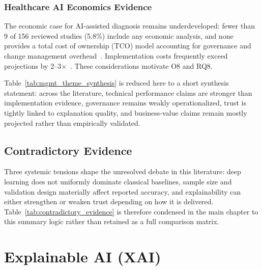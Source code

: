 \subsubsection{Healthcare AI Economics Evidence}

The economic case for AI-assisted diagnosis remains underdeveloped: fewer than 9 of 156 reviewed studies (5.8\%) include any economic analysis, and none provides a total cost of ownership (TCO) model accounting for governance and change management overhead~\cite{topol2019deep, sendak2020healthcare}. Implementation costs frequently exceed projections by 2--3$\times$~\cite{sendak2020healthcare}. These considerations motivate O8 and RQ8.

Table~\ref{tab:mgmt_theme_synthesis} is reduced here to a short synthesis statement: across the literature, technical performance claims are stronger than implementation evidence, governance remains weakly operationalized, trust is tightly linked to explanation quality, and business-value claims remain mostly projected rather than empirically validated.

\subsection{Contradictory Evidence}

Three systemic tensions shape the unresolved debate in this literature: deep learning does not uniformly dominate classical baselines, sample size and validation design materially affect reported accuracy, and explainability can either strengthen or weaken trust depending on how it is delivered. Table~\ref{tab:contradictory_evidence} is therefore condensed in the main chapter to this summary logic rather than retained as a full comparison matrix.

\section{Explainable AI (XAI)}

